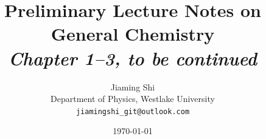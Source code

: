 \documentclass{chemistry}
\begin{document}
\title{Preliminary Lecture Notes on General Chemistry\\[0.5em]
       \large\textit{Chapter 1--3, to be continued}}

\author{Jiaming Shi\\[0.3em]
        \small Department of Physics, Westlake University\\
        \small\texttt{jiamingshi\_git@outlook.com}}

\date{\today}
\maketitle

\tableofcontents








\end{document}
